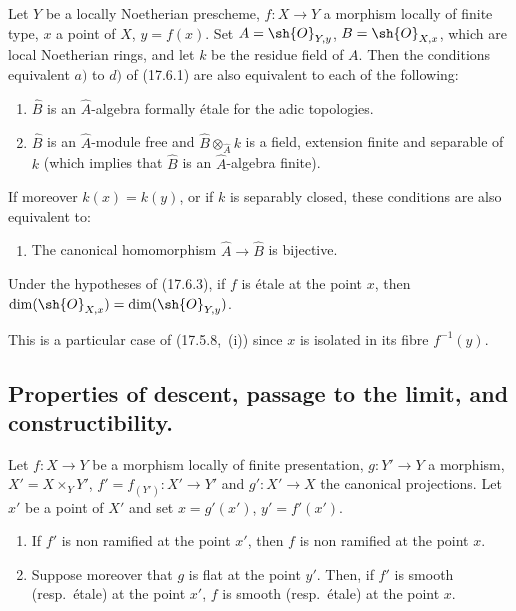 \begin{proposition}[17.6.3]
\label{IV.17.6.3}
Let $Y$ be a locally Noetherian prescheme, $f:X\to Y$ a morphism locally of finite type, $x$ a point of $X$, $y=f(x)$.
Set $A=\sh{O}_{Y,y}$, $B=\sh{O}_{X,x}$, which are local Noetherian rings, and let $k$ be the residue field of $A$.
Then the conditions equivalent $a)$ to $d)$ of (17.6.1) are also equivalent to each of the following:
\begin{enumerate}
  \item[e)] $\hat{B}$ is an $\hat{A}$-algebra formally \'etale for the adic topologies.
  \item[e')] $\hat{B}$ is an $\hat{A}$-module free and $\hat{B}\otimes_{\hat{A}}k$ is a field, extension finite and separable of $k$ (which implies that $\hat{B}$ is an $\hat{A}$-algebra finite).
\end{enumerate}
If moreover $k(x)=k(y)$, or if $k$ is separably closed, these conditions are also equivalent to:
\begin{enumerate}
  \item[e'')] The canonical homomorphism $\hat{A}\to\hat{B}$ is bijective.
\end{enumerate}
\end{proposition}

\begin{proposition}[17.6.4]
\label{IV.17.6.4}
Under the hypotheses of (17.6.3), if $f$ is \'etale at the point $x$, then $\dim(\sh{O}_{X,x})=\dim(\sh{O}_{Y,y})$.
\end{proposition}

This is a particular case of (17.5.8,~(i)) since $x$ is isolated in its fibre $f^{-1}(y)$.


\subsection{Properties of descent, passage to the limit, and constructibility.}
\label{subsection:IV.17.7}


\begin{proposition}[17.7.1]
\label{IV.17.7.1}
Let $f:X\to Y$ be a morphism locally of finite presentation, $g:Y'\to Y$ a morphism, $X'=X\times_Y Y'$, $f'=f_{(Y')}:X'\to Y'$ and $g':X'\to X$ the canonical projections.
Let $x'$ be a point of $X'$ and set $x=g'(x')$, $y'=f'(x')$.
\begin{enumerate}[label=(\roman*)]
  \item If $f'$ is non ramified at the point $x'$, then $f$ is non ramified at the point $x$.
  \item Suppose moreover that $g$ is flat at the point $y'$.
  Then, if $f'$ is smooth (resp.\ \'etale) at the point $x'$, $f$ is smooth (resp.\ \'etale) at the point $x$.
\end{enumerate}
\end{proposition}

